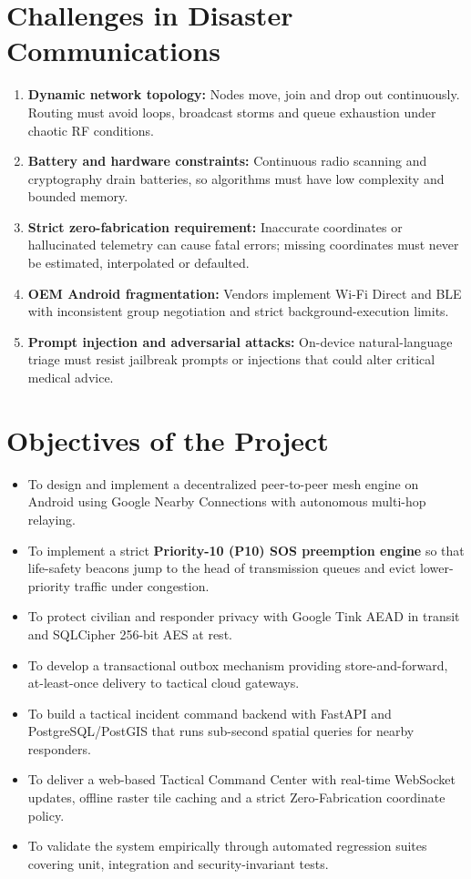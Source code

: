 \documentclass[12pt,a4paper]{report}
\begin{document}
\section{Challenges in Disaster Communications}
\begin{enumerate}
    \item \textbf{Dynamic network topology:} Nodes move, join and drop out continuously. Routing must avoid loops, broadcast storms and queue exhaustion under chaotic RF conditions.
    \item \textbf{Battery and hardware constraints:} Continuous radio scanning and cryptography drain batteries, so algorithms must have low complexity and bounded memory.
    \item \textbf{Strict zero-fabrication requirement:} Inaccurate coordinates or hallucinated telemetry can cause fatal errors; missing coordinates must never be estimated, interpolated or defaulted.
    \item \textbf{OEM Android fragmentation:} Vendors implement Wi-Fi Direct and BLE with inconsistent group negotiation and strict background-execution limits.
    \item \textbf{Prompt injection and adversarial attacks:} On-device natural-language triage must resist jailbreak prompts or injections that could alter critical medical advice.
\end{enumerate}

\section{Objectives of the Project}
\begin{itemize}
    \item To design and implement a decentralized peer-to-peer mesh engine on Android using Google Nearby Connections with autonomous multi-hop relaying.
    \item To implement a strict \textbf{Priority-10 (P10) SOS preemption engine} so that life-safety beacons jump to the head of transmission queues and evict lower-priority traffic under congestion.
    \item To protect civilian and responder privacy with Google Tink AEAD in transit and SQLCipher 256-bit AES at rest.
    \item To develop a transactional outbox mechanism providing store-and-forward, at-least-once delivery to tactical cloud gateways.
    \item To build a tactical incident command backend with FastAPI and PostgreSQL/PostGIS that runs sub-second spatial queries for nearby responders.
    \item To deliver a web-based Tactical Command Center with real-time WebSocket updates, offline raster tile caching and a strict Zero-Fabrication coordinate policy.
    \item To validate the system empirically through automated regression suites covering unit, integration and security-invariant tests.
\end{itemize}
\end{document}
